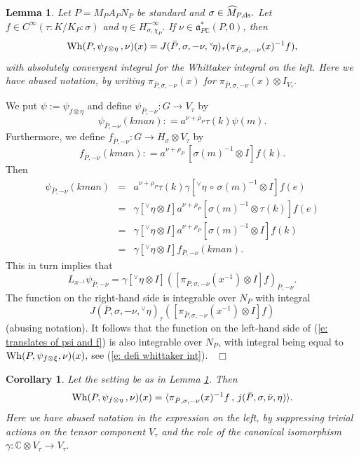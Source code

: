\documentclass[12pt,a4paper]{article}
\newtheorem{Cor}[Thm]{Corollary}
\newtheorem{Lemma}[Thm]{Lemma}
\newenvironment{cor}[0]{\begin{Cor}\noindent}%
{\end{Cor}}
\newenvironment{lemma}[0]{\begin{Lemma}\noindent}%
{\end{Lemma}}
\def\proof{\par\noindent{\it Proof.}{\ }{\ }}
\def\qed{~\hfill\hbox{$\Box$}\medbreak}
\def\msy#1{{\mathbb #1}}
\def\C{{\msy C}}
\def\gg{\gamma}
\def\gs{\sigma}
\def\got#1{\mathfrak #1}
\def\fa{{\got a}}
\def\to{\rightarrow}
\def\inp#1#2{\langle#1\,,\,#2\rangle}
\def\after{\,{\scriptstyle\circ}\,}
\def\iC{{\scriptscriptstyle \C}}
\numberwithin{Thm}{section}
\numberwithin{equation}{section}
\def\Vtau{V_\tau}
\def\Wh{{\rm Wh}}
\def\faPdc{{\fa_{P\iC}^*}}
\numberwithin{equation}{section}
\def\faPdc{\fa_{P\iC}^*}
\def\MPds{\widehat M_{P,\rm ds}}
\def\veec{\vee}%
\def\trw{{}^{\scriptscriptstyle\veec}}
\begin{document}
\begin{lemma} 
\label{l: whittaker integral as matrix coeff} 
Let $P =M_P A_P N_P$ be standard and $\gs \in \MPds.$
Let $f \in C^\infty(\tau:K/K_P:\gs)$ and $\eta \in H_{\gs, \chi_P}^{-\infty}.$ 
If $\nu \in \faPdc(P,0)$, then 
$$ 
\Wh(P, \psi_{f \otimes \eta} \,,\nu )(x) = J(\bar P, \gs,-\nu, \trw\!\eta)_\tau (\pi_{\bar P, \gs, -\nu}(x)^{-1} f),
$$%
with absolutely convergent integral for the Whittaker integral on the left.
Here we have abused notation, by writing $\pi_{\bar P, \gs, -\nu}(x)$ 
for $ \pi_{\bar P, \gs, -\nu}(x) \otimes I_{V_\tau}.$ 
\end{lemma}
\proof 
We put $\psi:= \psi_{f\otimes \eta}$ 
and define $\psi_{\bar P, -\nu} :  G \to  \Vtau$ 
by 
$$ 
\psi_{\bar P, -\nu}(kman): =  a^{\nu + \rho_P}  \tau(k)  \psi(m).
$$%
Furthermore, we define $f_{\bar P, -\nu}: G \to H_\gs \otimes V_\tau$ 
by 
$$ 
f_{\bar P, -\nu}(kman): = a^{\nu + \rho_P} \,  [\gs(m)^{-1} \otimes I]  f(k).
$$%
Then 
\begin{eqnarray*}
\psi_{\bar P, -\nu}(kman) &=& a^{\nu + \rho_P}  \tau(k) \gg [\trw\!\eta \after \gs(m)^{-1}\otimes I]f(e) \\
&=& 
 \gg[\trw\! \eta \otimes I]  a^{\nu + \rho_P} [ \gs(m)^{-1} \otimes \tau(k)] f(e)\\
 &=& 
\gg [\trw\!\eta \otimes I]  a^{\nu + \rho_P} [ \gs(m)^{-1} \otimes I] f(k)\\
 &=& 
 \gg [\trw\!\eta \otimes I] f_{\bar P, -\nu}(kman).
\end{eqnarray*}
This in turn implies that 
\begin{equation}
\label{e: translates of psi and f} 
L_{x^{-1}} \psi_{\bar P, -\nu} = \gg [\trw\eta  \otimes I] 
([\pi_{\bar P, \gs , -\nu}(x^{-1} ) \otimes I]f)_{\bar P, -\nu}.
\end{equation}
The function on the right-hand side is integrable over $N_P$ with integral
$$
J(\bar P, \gs, -\nu, \trw\!\eta)_\tau ([\pi_{\bar P, \gs , -\nu}(x^{-1} ) \otimes I]f)
$$%
(abusing notation). 
It follows that the function on the left-hand side of (\ref{e: translates of psi and f}) 
is also integrable over $N_P$, with integral being equal to $\Wh(P, \psi_{f\otimes \xi},\nu )(x),$
see (\ref{e: defi whittaker int}).
\qed

\begin{cor}
\label{c: Wh as matrix coeff with j}
Let the setting be as in Lemma \ref{l: whittaker integral as matrix coeff}. Then  
$$ 
\Wh(P, \psi_{f \otimes \eta}\, ,\nu )(x)  = 
\inp{\pi_{\bar P, \gs, -\nu}(x)^{-1} f}{j(\bar P, \gs , \bar \nu, \eta)}.
$$%
Here we have abused notation in the expression on 
the left, by suppressing 
trivial actions on  the tensor component $\Vtau$ 
and the role of the canonical isomorphism $\gg: \C \otimes \Vtau \to \Vtau.$  
\end{cor}
\end{document}
